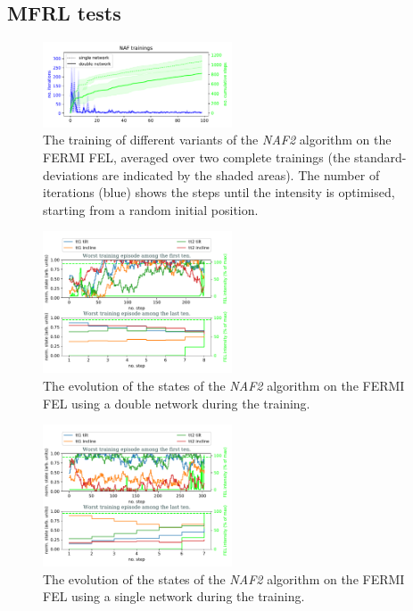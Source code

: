 \documentclass[
reprint,
amsmath,amssymb,amsfonts,clevref,
aps,
prstab,
]{revtex4-2}
\begin{document}
	\subsection{MFRL tests}
	\begin{figure}
		\centering
		\includegraphics*[width=0.5\textwidth]{Figures/FERMI_all_experiments_NAF_training_episodes.pdf}
		\caption{The training of different variants of the \emph{NAF2} algorithm  on the FERMI FEL, averaged over two complete trainings (the standard-deviations are indicated by the shaded areas). The number of iterations (blue) shows the steps until the intensity is optimised, starting from a random initial position.}
		\label{fig:NAF_training}
	\end{figure}
	\begin{figure}
		\centering
		\includegraphics*[width=0.5\textwidth]{Figures/Evolution_double.pdf}
		\caption{The evolution of the states of the \emph{NAF2} algorithm on the FERMI FEL using a double network during the training.}
		\label{fig:NAF_evolution_double}
	\end{figure}
	\begin{figure}
		\centering
		\includegraphics*[width=0.5\textwidth]{Figures/Evolution_single.pdf}
		\caption{The evolution of the states of the \emph{NAF2} algorithm on the FERMI FEL using a single network during the training.}
		\label{fig:NAF_evolution_single}
	\end{figure}
\end{document}
